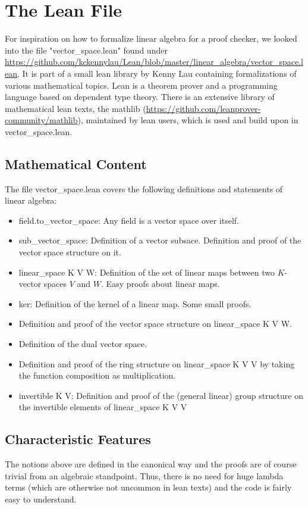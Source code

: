 \documentclass[11pt]{article}
\begin{document}
\newpage
\lstset{style=lean}
\section{The Lean File}
For inspiration on how to formalize linear algebra for a proof checker, we looked into the file "vector\_space.lean" found under \url{https://github.com/kckennylau/Lean/blob/master/linear_algebra/vector_space.lean}. It is part of a small lean library by Kenny Lau containing formalizations of various mathematical topics. Lean is a theorem prover and a programming language based on dependent type theory. There is an extensive library of mathematical lean texts, the mathlib (\url{https://github.com/leanprover-community/mathlib}), maintained by lean users, which is used and build upon in vector\_space.lean.



\subsection{Mathematical Content}
The file vector\_space.lean covers the following definitions and statements of linear algebra:
\begin{itemize}
\item {\lean field.to\_vector\_space}: Any field is a vector space over itself.
\item {\lean sub\_vector\_space}: Definition of a vector subsace. Definition and proof of the vector space structure on it.
\item {\lean linear\_space K V W}: Definition of the set of linear maps between two $K$-vector spaces $V$ and $W$. Easy proofs about linear maps.
\item {\lean ker}: Definition of the kernel of a linear map. Some small proofs.
\item Definition and proof of the vector space structure on {\lean linear\_space K V W}.
\item Definition of the dual vector space.
\item Definition and proof of the ring structure on {\lean linear\_space K V V} by taking the function composition as multiplication.
\item {\lean invertible K V}: Definition and proof of the (general linear) group structure on the invertible elements of {\lean linear\_space K V V}
\end{itemize}


%
\subsection{Characteristic Features} \label{characteristics}
The notions above are defined in the canonical way and the proofs are of course trivial from an algebraic standpoint. Thus, there is no need for huge lambda terms (which are otherwise not uncommon in lean texts) and the code is fairly easy to understand.
\end{document}
